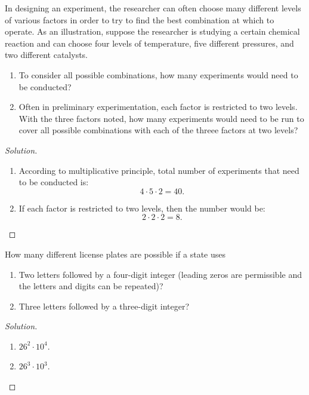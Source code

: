 \documentclass[class=probandstats,crop=false]{standalone}
\begin{document}
\begin{exercise}
    \par In designing an experiment, the researcher can often choose many different levels of various factors in order to try to find the best combination at which to operate. As an illustration, suppose the researcher is studying a certain chemical reaction and can choose four levels of temperature, five different pressures, and two different catalysts.
    \begin{enumerate}[label = \textbf{(\alph*)}]
        \item To consider all possible combinations, how many experiments would need to be conducted?
        \item Often in preliminary experimentation, each factor is restricted to two levels. With the three factors noted, how many experiments would need to be run to cover all possible combinations with each of the threee factors at two levels?
    \end{enumerate}
\end{exercise}

\begin{proof}[Solution]
    \begin{enumerate}[label = \textbf{(\alph*)}]
        \item According to multiplicative principle, total number of experiments that need to be conducted is:
              \[
                  4\cdot 5\cdot 2 = 40.
              \]
        \item If each factor is restricted to two levels, then the number would be:
              \[
                  2\cdot 2\cdot 2 = 8.
              \]
    \end{enumerate}
\end{proof}

\begin{exercise}
    \par How many different license plates are possible if a state uses
    \begin{enumerate}[label = (\alph*)]
        \item Two letters followed by a four-digit integer (leading zeros are permissible and the letters and digits can be repeated)?
        \item Three letters followed by a three-digit integer?
    \end{enumerate}
\end{exercise}

\begin{proof}[Solution]
    \begin{enumerate}[label = (\alph*)]
        \item $26^{2}\cdot 10^{4}$.
        \item $26^{3}\cdot 10^{3}$.
    \end{enumerate}
\end{proof}
\end{document}
